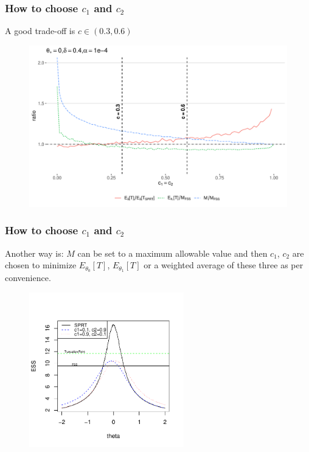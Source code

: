\documentclass[10pt]{beamer}
\begin{document}
\begin{frame}
\frametitle{How to choose $c_1$ and $c_2$}
A good trade-off is $c \in (0.3, 0.6)$

\begin{figure}
\centering
\includegraphics[height=0.7\textheight]{images/c1_c2_ratios}
\end{figure}

\end{frame}

\begin{frame}
\frametitle{How to choose $c_1$ and $c_2$}

Another way is: $M$ can be set to a maximum allowable value and then $c_1$, $c_2$ are chosen to minimize $E_{\theta_0}[T]$, $E_{\theta_1}[T]$ or a weighted average of these three as per convenience.

\begin{figure}
\centering
\includegraphics[height=0.7\textheight, width=0.6\textwidth]{IndustrialChoice.pdf}
\end{figure}

\end{frame}
\end{document}

